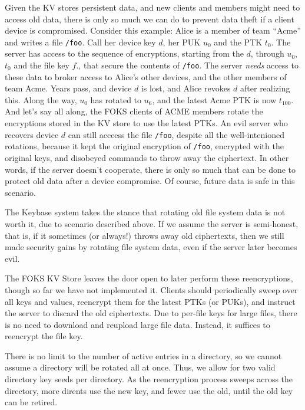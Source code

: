 Given the KV stores persistent data, and new clients and members might need to
access old data, there is only so much we can do to prevent data theft if a
client device is compromised.  Consider this example: Alice is a member of team
``Acme'' and writes a file \texttt{/foo}.  Call her device key $d$, her PUK
$u_0$ and the PTK $t_0$. The server has access to the sequence of encryptions,
starting from the $d$, through $u_0$, $t_0$ and the file key $f$., that secure the contents of
\texttt{/foo}. The server \textit{needs} access to these data to broker access
to Alice's other devices, and the other members of team Acme.
Years pass, and device $d$ is lost, and Alice revokes $d$ after
realizing this.  Along the way, $u_0$ has rotated to $u_6$, and the latest Acme
PTK is now $t_{100}$.  And let's say all along, the FOKS clients of ACME members
rotate the encryptions stored in the KV store to use the latest PTKs. An evil
server who recovers device $d$ can still acceess the file \texttt{/foo}, despite
all the well-intenioned rotations, because it kept the original encryption of
\texttt{/foo}, encrypted with the original keys, and disobeyed commands to throw
away the ciphertext. In other words, if the server doesn't cooperate, there is
only so much that can be done to protect old data after a device compromise.  Of
course, future data is safe in this scenario.

The Keybase system takes the stance that rotating old file system
data is not worth it, due to scenario described above. If we 
assume the server is semi-honest, that is, if it sometimes (or always!)
throws away old ciphertexts, then we still made
security gains by rotating file system data, even if the server later
becomes evil.

The FOKS KV Store leaves the door open to later perform these
reencryptions, though so far we have not implemented it.
Clients should periodically sweep over all keys and values,
reencrypt them for the latest PTKs (or PUKs), and instruct
the server to discard the old ciphertexts. Due to per-file
keys for large files, there is no need to download and reupload
large file data. Instead, it suffices to reencrypt the file key.

There is no limit to the number of active entries in a directory,
so we cannot assume a directory will be rotated all at once. Thus, 
we allow for two valid directory key seeds per directory. As the
reencryption process sweeps across the directory, more dirents
use the new key, and fewer use the old, until the old key can 
be retired.

